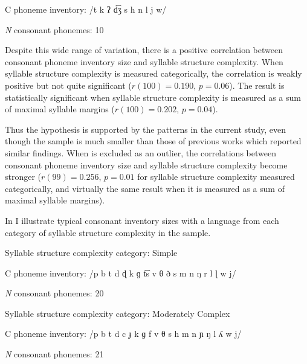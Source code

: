 \ea\label{ex:4.21}
\begin{Coding}
\item[C phoneme inventory:] /t k ʔ d͡ʒ s h n l j w/

\item[\textit{N} consonant phonemes:] 10
\end{Coding}
\z

  Despite this wide range of variation, there is a positive correlation between consonant phoneme inventory size and syllable structure complexity. When syllable structure complexity is measured categorically, the correlation is weakly positive but not quite significant ($r(100) = 0.190$, $p = 0.06$). The result is statistically significant when syllable structure complexity is measured as a sum of maximal syllable margins ($r(100) = 0.202$, $p = 0.04$).

  Thus the hypothesis is supported by the patterns in the current study, even though the sample is much smaller than those of previous works which reported similar findings. When  is excluded as an outlier, the correlations between consonant phoneme inventory size and syllable structure complexity become stronger ($r(99) = 0.256$, $p = 0.01$ for syllable structure complexity measured categorically, and virtually the same result when it is measured as a sum of maximal syllable margins).

  In  I illustrate typical consonant inventory sizes with a language from each category of syllable structure complexity in the sample.

\ea\label{ex:4.22}
\begin{Coding}
\item[Syllable structure complexity category:] Simple

\item[C phoneme inventory:] /p b t d ɖ k ɡ t͡s v θ ð s m n ŋ r l ɭ w j/

\item[\textit{N} consonant phonemes:] 20
\end{Coding}
\z

\ea\label{ex:4.23}
\begin{Coding}
\item[Syllable structure complexity category:] Moderately Complex

\item[C phoneme inventory:] /p b t d c ɟ k ɡ f v θ s h m n ɲ ŋ l ʎ w j/

\item[\textit{N} consonant phonemes:] 21
\end{Coding}
\z

